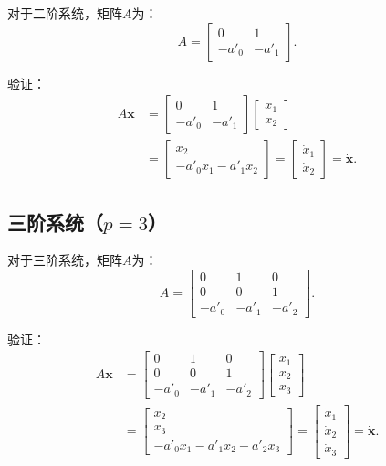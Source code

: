 \documentclass[12pt,a4paper]{article}
\begin{document}
对于二阶系统，矩阵$A$为：
\begin{equation}
A = \begin{bmatrix}
0 & 1 \\
-a'_0 & -a'_1
\end{bmatrix}.
\end{equation}

验证：
\begin{align}
A\mathbf{x} &= \begin{bmatrix} 0 & 1 \\ -a'_0 & -a'_1 \end{bmatrix} \begin{bmatrix} x_1 \\ x_2 \end{bmatrix} \\
&= \begin{bmatrix} x_2 \\ -a'_0 x_1 - a'_1 x_2 \end{bmatrix} = \begin{bmatrix} \dot{x}_1 \\ \dot{x}_2 \end{bmatrix} = \dot{\mathbf{x}}.
\end{align}

\subsection{三阶系统（$p=3$）}

对于三阶系统，矩阵$A$为：
\begin{equation}
A = \begin{bmatrix}
0 & 1 & 0 \\
0 & 0 & 1 \\
-a'_0 & -a'_1 & -a'_2
\end{bmatrix}.
\end{equation}

验证：
\begin{align}
A\mathbf{x} &= \begin{bmatrix} 0 & 1 & 0 \\ 0 & 0 & 1 \\ -a'_0 & -a'_1 & -a'_2 \end{bmatrix} \begin{bmatrix} x_1 \\ x_2 \\ x_3 \end{bmatrix} \\
&= \begin{bmatrix} x_2 \\ x_3 \\ -a'_0 x_1 - a'_1 x_2 - a'_2 x_3 \end{bmatrix} = \begin{bmatrix} \dot{x}_1 \\ \dot{x}_2 \\ \dot{x}_3 \end{bmatrix} = \dot{\mathbf{x}}.
\end{align}
\end{document}
